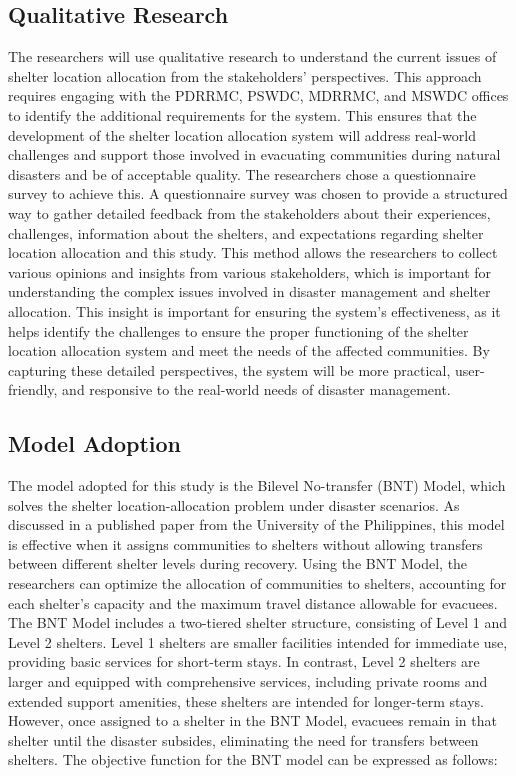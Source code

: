 \subsection{Qualitative Research}

The researchers will use qualitative research to understand the current issues of shelter location allocation from the stakeholders' perspectives. This approach requires engaging with the PDRRMC, PSWDC, MDRRMC, and MSWDC offices to identify the additional requirements for the system. This ensures that the development of the shelter location allocation system will address real-world challenges and support those involved in evacuating communities during natural disasters and be of acceptable quality.
The researchers chose a questionnaire survey to achieve this. A questionnaire survey was chosen to provide a structured way to gather detailed feedback from the stakeholders about their experiences, challenges, information about the shelters, and expectations regarding shelter location allocation and this study. This method allows the researchers to collect various opinions and insights from various stakeholders, which is important for understanding the complex issues involved in disaster management and shelter allocation.
This insight is important for ensuring the system's effectiveness, as it helps identify the challenges to ensure the proper functioning of the shelter location allocation system and meet the needs of the affected communities. By capturing these detailed perspectives, the system will be more practical, user-friendly, and responsive to the real-world needs of disaster management.

\subsection{Model Adoption}

The model adopted for this study is the Bilevel No-transfer (BNT) Model, which solves the shelter location-allocation problem under disaster scenarios. As discussed in a published paper from the University of the Philippines, this model is effective when it assigns communities to shelters without allowing transfers between different shelter levels during recovery. Using the BNT Model, the researchers can optimize the allocation of communities to shelters, accounting for each shelter’s capacity and the maximum travel distance allowable for evacuees.
The BNT Model includes a two-tiered shelter structure, consisting of Level 1 and Level 2 shelters. Level 1 shelters are smaller facilities intended for immediate use, providing basic services for short-term stays. In contrast, Level 2 shelters are larger and equipped with comprehensive services, including private rooms and extended support amenities, these shelters are intended for longer-term stays. However, once assigned to a shelter in the BNT Model, evacuees remain in that shelter until the disaster subsides, eliminating the need for transfers between shelters.
The objective function for the BNT model can be expressed as follows:

